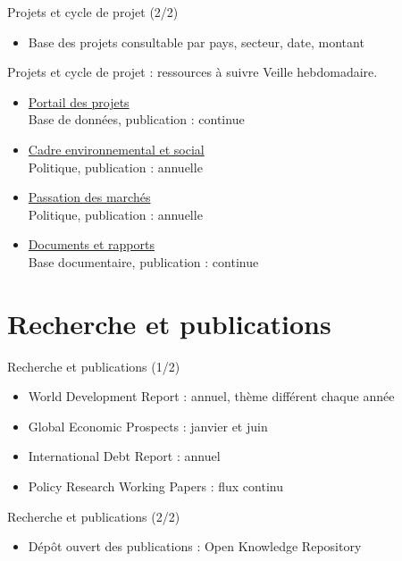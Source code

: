 \documentclass[aspectratio=169,11pt]{beamer}
\begin{document}
\begin{frame}{Projets et cycle de projet (2/2)}
\begin{itemize}
\item Base des projets consultable par pays, secteur, date, montant
\end{itemize}
\end{frame}

\begin{frame}{Projets et cycle de projet : ressources à suivre}
\small
Veille hebdomadaire.
\begin{itemize}
\item \href{https://projects.worldbank.org}{Portail des projets}\\{\footnotesize Base de données, publication : continue}
\item \href{https://www.worldbank.org/en/projects-operations/environmental-and-social-framework}{Cadre environnemental et social}\\{\footnotesize Politique, publication : annuelle}
\item \href{https://www.worldbank.org/en/projects-operations/procurement}{Passation des marchés}\\{\footnotesize Politique, publication : annuelle}
\item \href{https://documents.worldbank.org}{Documents et rapports}\\{\footnotesize Base documentaire, publication : continue}
\end{itemize}
\end{frame}

\section{Recherche et publications}
\begin{frame}{Recherche et publications (1/2)}
\begin{itemize}
\item World Development Report : annuel, thème différent chaque année
\item Global Economic Prospects : janvier et juin
\item International Debt Report : annuel
\item Policy Research Working Papers : flux continu
\end{itemize}
\end{frame}

\begin{frame}{Recherche et publications (2/2)}
\begin{itemize}
\item Dépôt ouvert des publications : Open Knowledge Repository
\end{itemize}
\end{frame}
\end{document}
